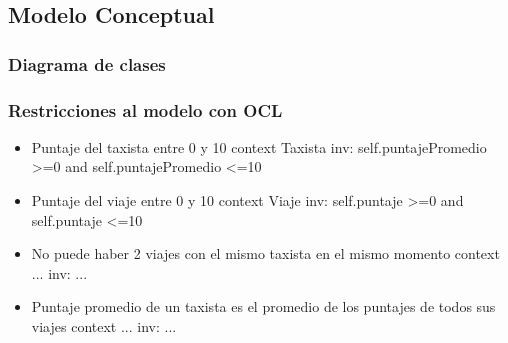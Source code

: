 \subsection{Modelo Conceptual}
\subsubsection{Diagrama de clases}
\subsubsection{Restricciones al modelo con OCL}
\begin{itemize}
	\item \begin{ocl}{Puntaje del taxista entre 0 y 10}
		  context Taxista
		  inv: self.puntajePromedio >=0 and
		       self.puntajePromedio <=10
		\end{ocl}
	
	\item \begin{ocl}{Puntaje del viaje entre 0 y 10}
		  context Viaje
		  inv: self.puntaje >=0 and
		       self.puntaje <=10
		\end{ocl}

	\item \begin{ocl}{No puede haber 2 viajes con el mismo taxista en el mismo momento}
		  context ...
		  inv: ...
		\end{ocl}

	\item \begin{ocl}{Puntaje promedio de un taxista es el promedio de los puntajes de todos sus viajes}
		  context ...
		  inv: ...
		\end{ocl}
\end{itemize}
